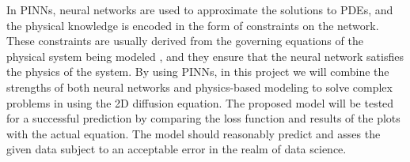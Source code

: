 In PINNs, neural networks are used to approximate the solutions to PDEs, and the physical knowledge is encoded in the form of constraints on the network. These constraints are usually derived from the governing equations of the physical system being modeled \cite{Hassan2017}, and they ensure that the neural network satisfies the physics of the system. By using PINNs, in this project we will combine the strengths of both neural networks and physics-based modeling to solve complex problems in using the 2D diffusion equation. The proposed model will be tested for a successful prediction by comparing the loss function and results of the plots with the actual equation. The model should reasonably predict and asses the given data subject to an acceptable error in the realm of data science.